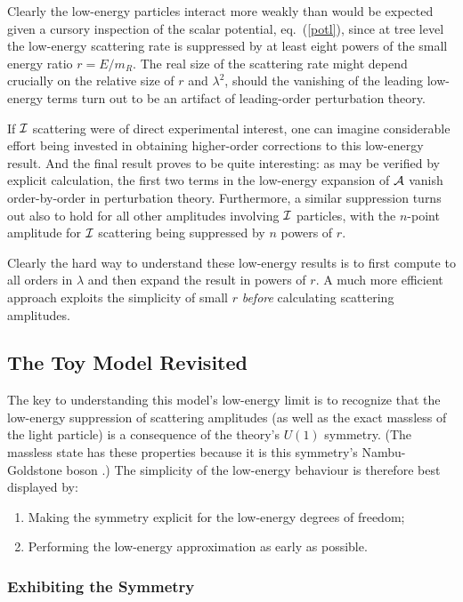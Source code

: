 \documentclass[12pt]{article}
\begin{document}
Clearly the low-energy particles interact more weakly than would
be expected given a cursory inspection of the scalar potential,
eq.~(\ref{potl}), since at tree level the low-energy scattering
rate is suppressed by at least eight powers of the small energy
ratio $r = E/m_{\scriptscriptstyle R}$. The real size of the
scattering rate might depend crucially on the relative size of $r$
and $\lambda^2$, should the vanishing of the leading low-energy
terms turn out to be an artifact of leading-order perturbation
theory.

If ${\cal I}$ scattering were of direct experimental interest, one
can imagine considerable effort being invested in obtaining
higher-order corrections to this low-energy result. And the final
result proves to be quite interesting: as may be verified by
explicit calculation, the first two terms in the low-energy
expansion of ${\cal A}$ vanish order-by-order in perturbation
theory. Furthermore, a similar suppression turns out also to hold
for all other amplitudes involving ${\cal I}$ particles, with the
$n$-point amplitude for ${\cal I}$ scattering being suppressed by
$n$ powers of $r$.

Clearly the hard way to understand these low-energy results is to
first compute to all orders in $\lambda$ and then expand the
result in powers of $r$. A much more efficient approach exploits
the simplicity of small $r$ {\sl before} calculating scattering
amplitudes.

\subsection{The Toy Model Revisited}
%
The key to understanding this model's low-energy limit is to
recognize that the low-energy suppression of scattering amplitudes
(as well as the exact massless of the light particle) is a
consequence of the theory's $U(1)$ symmetry. (The massless state
has these properties because it is this symmetry's Nambu-Goldstone
boson \cite{ChiPT,physica,GBreviews,Burgess00}.) The simplicity of
the low-energy behaviour is therefore best displayed by:

\begin{enumerate}
\item
Making the symmetry explicit for the low-energy degrees of
freedom;
%
\item
Performing the low-energy approximation as early as possible.
%
\end{enumerate}

\subsubsection{Exhibiting the Symmetry}
\end{document}
